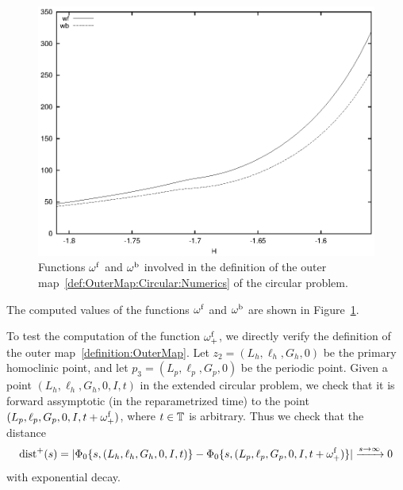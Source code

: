 \begin{figure}
\includegraphics{figs/omega_fb}
\caption{Functions $\omega^{\mathrm{f}}$ and $\omega^{\mathrm{b}}$ involved in the
definition of the outer map~\eqref{def:OuterMap:Circular:Numerics} of
the circular problem.}
\label{fig:outer_circular}
\end{figure}

The computed values of the functions $\omega^{\mathrm{f}}$ and $\omega^{\mathrm{b}}$
are shown in Figure~\ref{fig:outer_circular}.

To test the computation of the function $\omega_+^{\mathrm{f}}$, we directly
verify the definition of the outer map~\ref{definition:OuterMap}.
Let $z_2 = (L_h,\ell_h,G_h,0)$ be the primary homoclinic point, and
let $p_3 = (L_p,\ell_p,G_p,0)$ be the periodic point. 
Given a point $(L_h,\ell_h,G_h,0, I, t)$ in the extended circular
problem, we check that it is forward assymptotic (in the
reparametrized time) to the point $(L_p,\ell_p,G_p,0, I,
t+\omega_+^{\mathrm{f}})$, where $t\in\mathbb{T}$ is arbitrary.
Thus we check that the distance
\[ \mathrm{dist}^+(s) = |\Phi_0\{s,(L_h,\ell_h,G_h,0, I, t)\} - 
\Phi_0\{s,(L_p,\ell_p,G_p,0, I, t+\omega_+^{\mathrm{f}})\}| 
\xrightarrow{s\to\infty} 0 \]
with exponential decay.

